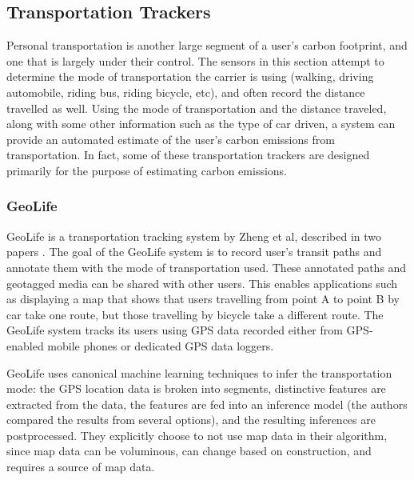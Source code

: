 \subsection{Transportation Trackers}

Personal transportation is another large segment of a user's carbon footprint, and one that is largely under their control. The sensors in this section attempt to determine the mode of transportation the carrier is using (walking, driving automobile, riding bus, riding bicycle, etc), and often record the distance travelled as well. Using the mode of transportation and the distance traveled, along with some other information such as the type of car driven, a system can provide an automated estimate of the user's carbon emissions from transportation. In fact, some of these transportation trackers are designed primarily for the purpose of estimating carbon emissions.

\subsubsection{GeoLife}

GeoLife is a transportation tracking system by Zheng et al, described in two papers \cite{zheng-learning-mode-2008, Zheng2008Understanding-mobility}. The goal of the GeoLife system is to record user's transit paths and annotate them with the mode of transportation used. These annotated paths and geotagged media can be shared with other users. This enables applications such as displaying a map that shows that users travelling from point A to point B by car take one route, but those travelling by bicycle take a different route. The GeoLife system tracks its users using GPS data recorded either from GPS-enabled mobile phones or dedicated GPS data loggers.

GeoLife uses canonical machine learning techniques to infer the transportation mode: the GPS location data is broken into segments, distinctive features are extracted from the data, the features are fed into an inference model (the authors compared the results from several options), and the resulting inferences are postprocessed. They explicitly choose to not use map data in their algorithm, since map data can be voluminous, can change based on construction, and requires a source of map data.

